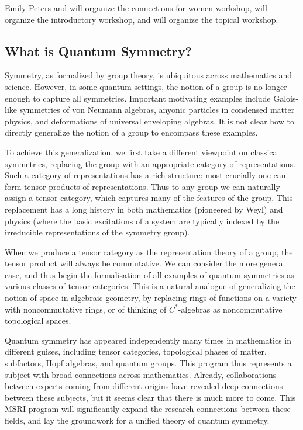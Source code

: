 \documentclass[11pt]{article}
\begin{document}
Emily Peters and \nn{} will organize the connections for women workshop, \nn{} will organize the introductory workshop, and \nn{} will organize the topical workshop.


\subsection{What is Quantum Symmetry?}

Symmetry, as formalized by group theory, is ubiquitous across mathematics and science.  However, in some quantum settings, the notion of a group is no longer enough to capture all symmetries.  Important motivating examples include Galois-like symmetries of von Neumann algebras, anyonic particles in condensed matter physics, and deformations of universal enveloping algebras. It is not clear how to directly generalize the notion of a group to encompass these examples.

To achieve this generalization, we first take a different viewpoint on classical symmetries, replacing the group with an appropriate category of representations.  Such a category of representations has a rich structure: most crucially one can form tensor products of representations.  Thus to any group we can naturally assign a tensor category, which captures many of the features of the group. This replacement has a long history in both mathematics (pioneered by Weyl) and physics (where the basic excitations of a system are typically indexed by the irreducible representations of the symmetry group).

When we produce a tensor category as the representation theory of a group, the tensor product will always be commutative. We can consider the more general case, and thus begin the formalisation of all examples of quantum symmetries as various classes of tensor categories. This is a natural analogue of generalizing the notion of space in algebraic geometry, by replacing rings of functions on a variety with noncommutative rings, or of thinking of $C^*$-algebras as noncommutative topological spaces.

Quantum symmetry has appeared independently many times in mathematics in different guises, including tensor categories, topological phases of matter, subfactors, Hopf algebras, and quantum groups. This program thus represents a subject with broad connections across mathematics. Already, collaborations between experts coming from different origins have revealed deep connections between these subjects, but it seems clear that there is much more to come. This MSRI program will significantly expand the research connections between these fields, and lay the groundwork for a unified theory of quantum symmetry.
\end{document}
